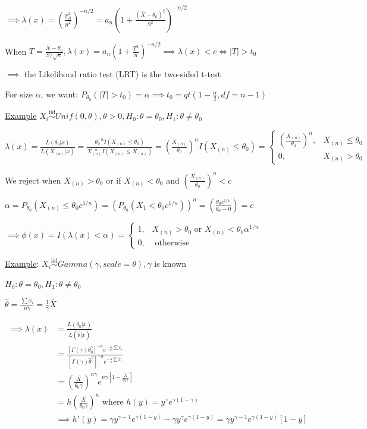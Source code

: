\documentclass{article}
\let\Oldsum=\sum
\renewcommand{\sum}{\Oldsum\limits}
\newcommand{\iiddist}{\overset{\mathrm{iid}}{\sim}}
\begin{document}
$\implies \lambda(x) = (\frac{\hat{\sigma}^2_R}{\hat{\sigma}^2})^{-n/2} = a_n(1 + \frac{(\bar{X} - \theta_0)^2}{S^2})^{-n/2}$

When $T = \frac{\bar{X} - \theta_0}{S/\sqrt{n}}, \lambda(x) = a_n(1 + \frac{T^2}{n})^{-n/2} \implies \lambda(x) < c \iff |T| > t_0$

$\implies$ the Likelihood ratio test (LRT) is the two-sided t-test

For size $\alpha$, we want: $P_{\theta_0}(|T| > t_0) = \alpha \implies t_0 = qt(1-\frac{\alpha}{2}, df = n-1)$

\underline{Example} $X_i \iiddist Unif(0, \theta), \theta > 0, H_0: \theta = \theta_0, H_1:\theta \neq \theta_0$

$\lambda(x) = \frac{L(\theta_0|x)}{L(X_{(n)}|x)} = \frac{\theta_0^{-n}I(X_{(n)} \le \theta_0)}{X_{(n)}^{-n}I(X_{(n)} \le X_{(n)})} = (\frac{X_{(n)}}{\theta_0})^n I(X_{(n)} \le \theta_0) = \begin{cases} (\frac{X_{(n)}}{\theta_0})^n, & X_{(n)} \le \theta_0 \\ 0, & X_{(n)} > \theta_0 \end{cases}$

We reject when $X_{(n)} > \theta_0$ or if $X_{(n)} < \theta_0$ and $(\frac{X_{(n)}}{\theta_0})^n < c$

$\alpha = P_{\theta_0}(X_{(n)} \le \theta_0 c^{1/n}) = (P_{\theta_0}(X_1 < \theta_0 c^{1/n}))^n = (\frac{\theta_0 c^{1/n}}{\theta_0 - 0}) = c$

$\implies \phi(x) = I(\lambda(x) < \alpha) = \begin{cases} 1, & X_{(n)} > \theta_0 \text{ or } X_{(n)} < \theta_0 \alpha^{1/n} \\ 0, & \text{ otherwise} \end{cases}$

\underline{Example}: $X_i \iiddist Gamma(\gamma, scale = \theta), \gamma$ is known

$H_0: \theta=\theta_0, H_1: \theta \neq \theta_0$

$\hat{\theta} = \frac{\sum x_i}{n\gamma} = \frac{1}{\gamma}\bar{X}$

$$
\begin{aligned}
\implies \lambda(x) 
& = \frac{L(\theta_0|x)}{L(\hat{\theta}|x)} \\
& = \frac{[\Gamma(\gamma)\theta_0^{\gamma}]^{-n} e^{-\frac{1}{\theta_0}\sum x_i}}{[\Gamma(\gamma)\hat{\theta}^{\gamma}]^{-n} e^{-\frac{1}{\hat{\theta}} \sum x_i}} \\ 
& = (\frac{\bar{X}}{\theta_0 \gamma})^{n\gamma} e^{n\gamma [1 -\frac{\bar{X}}{\theta_0 \gamma}]} \\
& = h(\frac{\bar{X}}{\theta_0 \gamma})^n \text{ where } h(y) = y^{\gamma} e^{\gamma (1-\gamma)} \\ 
& \implies h'(y) = \gamma y^{\gamma -1} e^{\gamma(1-y)} - \gamma y^{\gamma} e^{\gamma(1-y)} = \gamma y^{\gamma - 1} e^{\gamma(1-y)}[1-y]
\end{aligned}
$$
\end{document}
